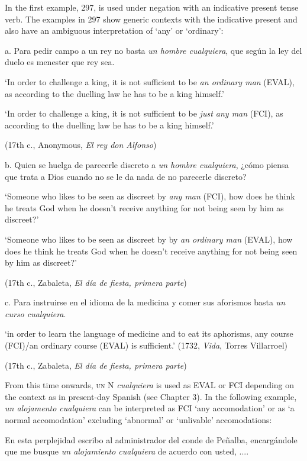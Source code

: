 \documentclass[output=paper]{langscibook}
\begin{document}
  In the first example, 297, is used under negation with an indicative present tense verb. The examples in 297 show generic contexts with the indicative present and also have an ambiguous interpretation of ‘any’ or ‘ordinary’:

  a.  Para pedir campo a un rey no basta \textit{un hombre cualquiera}, que según la ley del duelo es menester que rey sea. 

    ‘In order to challenge a king, it is not sufficient to be \textit{an ordinary man} (EVAL), as according to the duelling law he has to be a king himself.’

‘In order to challenge a king, it is not sufficient to be \textit{just any man} (FCI), as according to the duelling law he has to be a king himself.’

    (17th c., Anonymous, \textit{El rey don Alfonso})

  b.  Quien se huelga de parecerle discreto a \textit{un hombre cualquiera}, ¿cómo piensa que trata a Dios cuando no se le da nada de no parecerle discreto? 

    ‘Someone who likes to be seen as discreet by \textit{any man} (FCI), how does he think he treats God when he doesn’t receive anything for not being seen by him as discreet?’

    ‘Someone who likes to be seen as discreet by by \textit{an ordinary man} (EVAL), how does he think he treats God when he doesn’t receive anything for not being seen by him as discreet?’

    (17th c., Zabaleta, \textit{El día de fiesta, primera parte})

  c.  Para instruirse en el idioma de la medicina y comer sus aforismos basta \textit{un curso cualquiera}. 

    ‘in order to learn the language of medicine and to eat its aphorisms, any course (FCI)/an ordinary course (EVAL) is sufficient.’ (1732, \textit{Vida}, Torres Villarroel)

    (17th c., Zabaleta, \textit{El día de fiesta, primera parte})

From this time onwards, \textsc{un} N \textit{cualquiera} is used as EVAL or FCI depending on the context as in present-day Spanish (see Chapter 3). In the following example, \textit{un alojamento cualquiera} can be interpreted as FCI ‘any accomodation’ or as ‘a normal accomodation’ excluding ‘abnormal’ or ‘unlivable’ accomodations:

    En esta perplejidad escribo al administrador del conde de Peñalba, encargándole que me busque \textit{un alojamiento cualquiera} de acuerdo con usted, .... 
\end{document}
